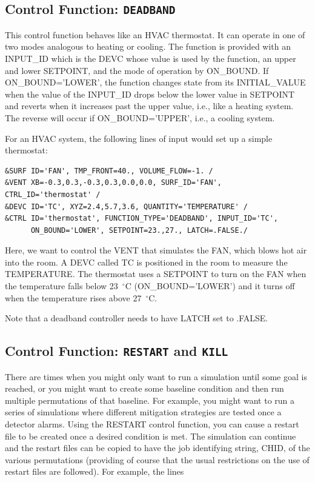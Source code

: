 \documentclass[11pt]{book}
\begin{document}
\subsection{Control Function: \texorpdfstring{{\tt DEADBAND}}{DEADBAND}}
\label{info:DEADBAND}

This control function behaves like an HVAC thermostat.  It can operate in one of two modes analogous to heating or cooling.
The function is provided with an {\ct INPUT\_ID} which is the {\ct DEVC} whose value is used by the function,
an upper and lower {\ct SETPOINT}, and the mode of operation by {\ct ON\_BOUND}.  If  {\ct ON\_BOUND='LOWER'},
the function changes state from its {\ct INITIAL\_VALUE} when the value of the {\ct INPUT\_ID} drops
below the lower value in {\ct SETPOINT} and reverts when it increases past the upper value, i.e., like a heating system.
The reverse will occur if {\ct ON\_BOUND='UPPER'}, i.e., a cooling system.

For an HVAC system, the following lines of input would set up a simple thermostat:

\begin{lstlisting}
&SURF ID='FAN', TMP_FRONT=40., VOLUME_FLOW=-1. /
&VENT XB=-0.3,0.3,-0.3,0.3,0.0,0.0, SURF_ID='FAN', CTRL_ID='thermostat' /
&DEVC ID='TC', XYZ=2.4,5.7,3.6, QUANTITY='TEMPERATURE' /
&CTRL ID='thermostat', FUNCTION_TYPE='DEADBAND', INPUT_ID='TC',
      ON_BOUND='LOWER', SETPOINT=23.,27., LATCH=.FALSE./
\end{lstlisting}

\noindent
Here, we want to control the {\ct VENT} that simulates the {\ct FAN}, which blows hot air
into the room. A {\ct DEVC} called {\ct TC} is positioned in the room to measure the {\ct TEMPERATURE}.
The {\ct thermostat} uses a {\ct SETPOINT} to turn on the
{\ct FAN} when the temperature falls below 23~$^\circ$C ({\ct ON\_BOUND='LOWER'})
and it turns off when the temperature rises above 27~$^\circ$C.


Note that a deadband controller needs to have {\ct LATCH} set to {\ct .FALSE.}


\subsection{Control Function: \texorpdfstring{{\tt RESTART} and {\tt KILL}} {RESTARTKILL} }

There are times when you might only want to run a simulation until some
goal is reached, or you might want to create some
baseline condition and then run multiple permutations of that baseline.
For example, you might want to run a series of simulations where
different mitigation strategies are tested once a detector alarms.
Using the {\ct RESTART}
control function, you can cause a restart file
to be created once a desired condition is met.  The simulation can
continue and the restart files can be copied to have the job identifying string, {\ct CHID}, of
the various permutations (providing of course that the usual
restrictions on the use of restart files are followed).
For example, the lines
\end{document}
